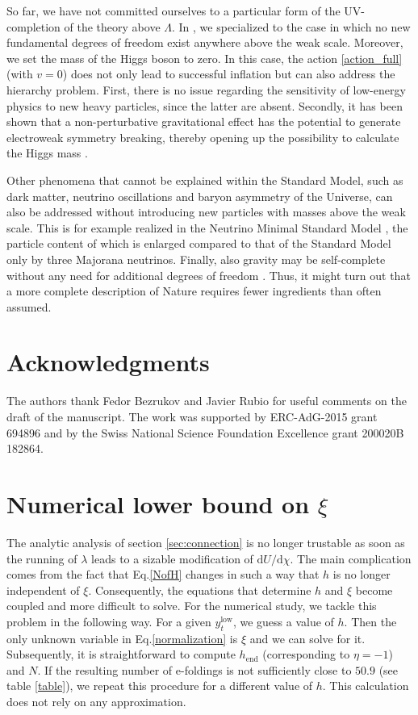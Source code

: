 \documentclass[a4paper,11pt]{article}
\makeatletter
\newcommand*{\Eq}{Eq.\@\xspace}
\newcommand*\diff{\mathrm{d}} %
\makeatother
\begin{document}
So far, we have not committed ourselves to a particular form of the UV-completion of the theory above $\Lambda$. In \cite{2001.09088}, we specialized to the case in which no new fundamental degrees of freedom exist anywhere above the weak scale. Moreover, we set the mass of the Higgs boson to zero. In this case, the action \eqref{action_full} (with $v=0$) does not only lead to successful inflation but can also address the hierarchy problem. First, there is no issue regarding the sensitivity of low-energy physics to new heavy particles, since the latter are absent. Secondly, it has been shown that a non-perturbative gravitational effect has the potential to generate electroweak symmetry breaking, thereby opening up the possibility to calculate the Higgs mass \cite{2001.09088}.

Other phenomena that cannot be explained within the Standard Model, such as dark matter, neutrino oscillations and baryon asymmetry of the Universe, can also be addressed without introducing new particles with masses above the weak scale. This is for example realized in the Neutrino Minimal Standard Model \cite{Asaka:2005an, Asaka:2005pn}, the particle content of which is enlarged compared to that of the Standard Model only by three Majorana neutrinos. Finally, also gravity may be self-complete without any need for additional degrees of freedom \cite{1005.3497, 1010.1415, 1103.5963}. Thus, it might turn out that a more complete description of Nature requires fewer ingredients than often assumed.

\section*{Acknowledgments}

The authors thank Fedor Bezrukov and Javier Rubio for useful comments on the draft of the manuscript. The work was supported by ERC-AdG-2015 grant 694896 and by the Swiss National Science Foundation Excellence grant 200020B\underline{ }182864.

\appendix

\section{Numerical lower bound on $\xi$}
\label{app}

The analytic analysis of section \ref{sec:connection} is no longer trustable as soon as the running of $\lambda$ leads to a sizable modification of $\diff U/\diff \chi$. The main complication comes from the fact that \Eq \eqref{NofH} changes in such a way that $h$ is no longer independent of $\xi$. Consequently, the equations that determine $h$ and $\xi$ become coupled and more difficult to solve.
For the numerical study, we tackle this problem in the following way. For a given $y_t^{\text{low}}$, we guess a value of $h$. Then the only unknown variable in \Eq \eqref{normalization} is $\xi$ and we can solve for it. Subsequently, it is straightforward to compute $h_{\text{end}}$ (corresponding to $\eta=-1$) and $N$. If the resulting number of e-foldings is not sufficiently close to $50.9$ (see table \ref{table}), we repeat this procedure for a different value of $h$. This calculation does not rely on any approximation.
\end{document}
